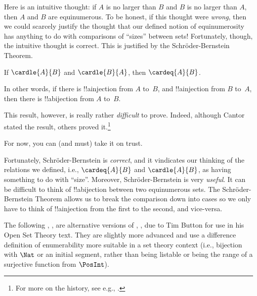 
\begin{explain}
Here is an intuitive thought: if $A$ is no larger than $B$ and $B$ is
no larger than $A$, then $A$ and $B$ are equinumerous. To be honest,
if this thought were \emph{wrong}, then we could scarcely justify the
thought that our defined notion of equinumerosity has anything to do
with comparisons of ``sizes'' between sets!{} Fortunately, though,
the intuitive thought is correct. This is justified by the
Schr\"oder-Bernstein Theorem.
\end{explain}

\begin{thm}
	If $\cardle{A}{B}$ and $\cardle{B}{A}$,
	then $\cardeq{A}{B}$.
\end{thm}

\begin{explain}
In other words, if there is !!a{injection} from $A$ to~$B$, and
!!a{injection} from $B$ to~$A$, then there is !!a{bijection} from $A$
to~$B$. 

This result, however, is really rather \emph{difficult} to prove.
Indeed, although Cantor stated the result, others proved
it.\footnote{For more on the history, see e.g.,
\citet[pp.~165--6]{Potter2004}.}

For now, you can (and must)
take it on trust. 

Fortunately, Schr\"oder-Bernstein is \emph{correct}, and it
vindicates our thinking of the relations we defined, i.e.,
$\cardeq{A}{B}$ and $\cardle{A}{B}$, as having something to do with
``size''. Moreover, Schr\"oder-Bernstein is very \emph{useful}. It
can be difficult to think of !!a{bijection} between two equinumerous
sets. The Schr\"oder-Bernstein Theorem allows us to break the comparison
down into cases so we only have to think of !!a{injection} from the
first to the second, and vice-versa.
\end{explain}


\begin{editorial}
The following ,
,  are
alternative versions of ,
,  due to Tim
Button for use in his Open Set Theory text. They are slightly more
advanced and use a difference definition of enumerability more
suitable in a set theory context (i.e., bijection with $\Nat$ or an
initial segment, rather than being listable or being the range of a
surjective function from $\PosInt$).
\end{editorial}



